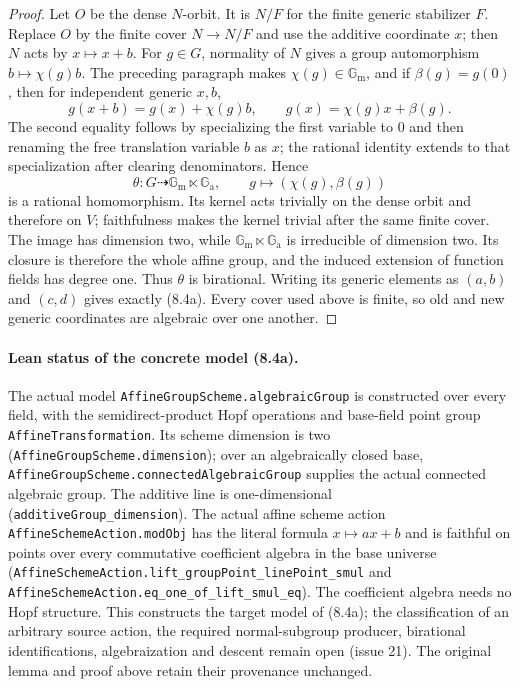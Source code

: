 \documentclass[11pt,oneside]{article}
\theoremstyle{definition}
\theoremstyle{remark}
\newcommand{\Ga}{\mathbb G_{\mathrm a}}
\newcommand{\Gm}{\mathbb G_{\mathrm m}}
\newcommand{\lean}[1]{\nolinkurl{#1}}
\begin{document}
\begin{proof}
Let $O$ be the dense $N$-orbit.  It is $N/F$ for the finite generic stabilizer $F$.
Replace $O$ by the finite cover $N\to N/F$ and use the additive coordinate $x$; then
$N$ acts by $x\mapsto x+b$.  For $g\in G$, normality of $N$ gives a group automorphism
$b\mapsto\chi(g)b$.  The preceding paragraph makes $\chi(g)\in\Gm$, and if
$\beta(g)=g(0)$, then for independent generic $x,b$,
\[
 g(x+b)=g(x)+\chi(g)b,\qquad g(x)=\chi(g)x+\beta(g).           \tag{8.4b}
\]
The second equality follows by specializing the first variable to $0$ and then renaming
the free translation variable $b$ as $x$; the rational identity extends to that
specialization after clearing denominators.  Hence
\[
 \theta:G\dashrightarrow\Gm\ltimes\Ga,\qquad
 g\longmapsto(\chi(g),\beta(g))
\]
is a rational homomorphism.  Its kernel acts trivially on the dense orbit and therefore
on $V$; faithfulness makes the kernel trivial after the same finite cover.  The image has
dimension two, while $\Gm\ltimes\Ga$ is irreducible of dimension two.  Its closure is
therefore the whole affine group, and the induced extension of function fields has
degree one.  Thus $\theta$ is birational.  Writing its generic elements as $(a,b)$ and
$(c,d)$ gives exactly (8.4a).  Every cover used above is finite, so old and new generic
coordinates are algebraic over one another.
\end{proof}

\paragraph{Lean status of the concrete model (8.4a).}
The actual model \lean{AffineGroupScheme.algebraicGroup} is constructed over every
field, with the semidirect-product Hopf operations and base-field point group
\lean{AffineTransformation}. Its scheme dimension is two
(\lean{AffineGroupScheme.dimension}); over an algebraically closed base,
\lean{AffineGroupScheme.connectedAlgebraicGroup} supplies the actual connected
algebraic group. The additive line is one-dimensional (\lean{additiveGroup_dimension}). The actual affine scheme
action \lean{AffineSchemeAction.modObj} has the literal formula $x\mapsto ax+b$
and is faithful on points over every commutative coefficient algebra in the base
universe (\lean{AffineSchemeAction.lift_groupPoint_linePoint_smul} and
\lean{AffineSchemeAction.eq_one_of_lift_smul_eq}). The coefficient algebra needs no
Hopf structure. This constructs the target model of (8.4a); the classification of
an arbitrary source action, the required normal-subgroup producer, birational
identifications, algebraization and descent remain open (issue 21). The original
lemma and proof above retain their provenance unchanged.
\end{document}
